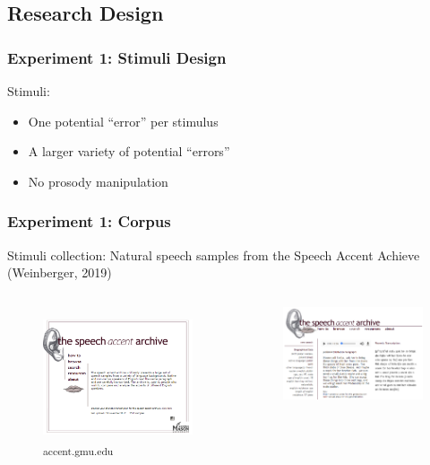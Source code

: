 \documentclass{beamer}
\begin{document}
\subsection{Research Design}
\begin{frame}
\frametitle{Experiment 1: Stimuli Design}
Stimuli:
\begin{itemize} 
\item One potential “error” per stimulus 
\item A larger variety of  potential “errors”
\item No prosody manipulation 
\end{itemize}

\end{frame}
\begin{frame}
\frametitle{Experiment 1: Corpus}
Stimuli collection: \linebreak
Natural speech samples from the Speech Accent Achieve (Weinberger, 2019)
\begin{columns}[c] %
\begin{figure}
\includegraphics[width=0.8\linewidth]{figures/accent}
\linebreak \textsubscript{accent.gmu.edu}
\end{figure}
\begin{figure}
\includegraphics[width=0.8\linewidth]{figures/saademo}
\end{figure}
\end{columns}
\end{frame}
\end{document}
